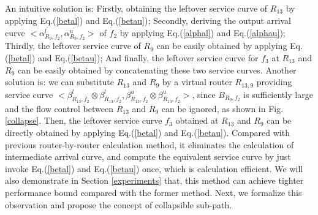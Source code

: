 \documentclass[10pt,journal]{IEEEtran}
\begin{document}
An intuitive solution is: Firstly, obtaining the leftover service curve of $R_{13}$ by applying Eq.(\ref{betal}) and Eq.(\ref{betau}); Secondly, deriving the output arrival curve $<\alpha_{R_{9},f_2}^{l^\prime},\alpha_{R_{9},f_2}^{u^\prime}>$ of $f_2$ by applying Eq.(\ref{alphal}) and Eq.(\ref{alphau}); Thirdly, the leftover service curve of $R_9$ can be easily obtained by applying Eq.(\ref{betal}) and Eq.(\ref{betau}); And finally, the leftover service curve for $f_3$ at $R_{13}$ and $R_9$ can be easily obtained by concatenating these two service curves. Another solution is: we can substitute $R_{13}$ and $R_{9}$ by a virtual router $R_{13,9}$ providing service curve $<\beta_{R_{13},f_2}^l\otimes\beta_{R_{13},f_2}^l,\beta_{R_{13},f_2}^u\otimes\beta_{R_{13},f_2}^u>$, since $B_{R_9,f_2}$ is sufficiently large and the flow control between $R_{13}$ and $R_9$ can be ignored, as shown in Fig. \ref{collapse}. Then, the leftover service curve $f_3$ obtained at $R_{13}$ and $R_{9}$ can be directly obtained by applying Eq.(\ref{betal}) and Eq.(\ref{betau}). Compared with previous router-by-router calculation method, it eliminates the calculation of intermediate arrival curve, and compute the equivalent service curve by just invoke Eq.(\ref{betal}) and Eq.(\ref{betau}) once, which is calculation efficient. We will also demonstrate in Section \ref{experiments} that, this method can achieve tighter performance bound compared with the former method. Next, we formalize this observation and propose the concept of collapsible sub-path.
\end{document}
